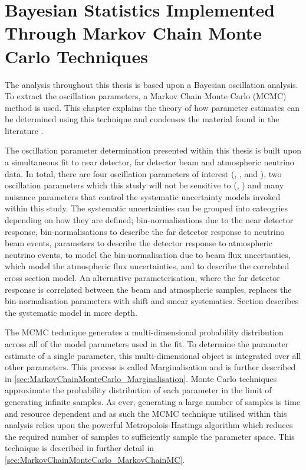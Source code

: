 \chapter{Bayesian Statistics Implemented Through Markov Chain Monte Carlo Techniques}
\label{chap:MarkovChainMonteCarlo}
The analysis throughout this thesis is based upon a Bayesian oscillation analysis. To extract the oscillation parameters, a Markov Chain Monte Carlo (MCMC) method is used. This chapter explains the theory of how parameter estimates can be determined using this technique and condenses the material found in the literature \cite{mcmc_handbook, mcmc_practice, thesis_clarence, thesis_kirsty}.

The oscillation parameter determination presented within this thesis is built upon a simultaneous fit to near detector, far detector beam and atmospheric neutrino data. In total, there are four oscillation parameters of interest (\sinsqatm, \sinsqreac, \delmsqatm and \dcp), two oscillation parameters which this study will not be sensitive to (\sinsqsol, \delmsqsol) and  many nuisance parameters that control the systematic uncertainty models invoked within this study. The systematic uncertainties can be grouped into cateogries depending on how they are defined;  bin-normalisations due to the near detector response,  bin-normalisations to describe the far detector response to neutrino beam events,  parameters to describe the detector response to atmospheric neutrino events,  to model the bin-normalisation due to beam flux uncertanties,  which model the atmospheric flux uncertainties, and  to describe the correlated cross section model. An alternative parameterisation, where the far detector response is correlated between the beam and atmospheric samples, replaces the bin-normalisation parameters with  shift and smear systematics. Section  describes the systematic model in more depth.

The MCMC technique generates a multi-dimensional probability distribution across all of the model parameters used in the fit. To determine the parameter estimate of a single parameter, this multi-dimensional object is integrated over all other parameters. This process is called Marginalisation and is further described in \autoref{sec:MarkovChainMonteCarlo_Marginalisation}. Monte Carlo techniques approximate the probability distribution of each parameter in the limit of generating infinite samples. As ever, generating a large number of samples is time and resource dependent and as such the MCMC technique utilised within this analysis relies upon the powerful Metropolois-Hastings algorithm which reduces the required number of samples to sufficiently sample the parameter space. This technique is described in further detail in \autoref{sec:MarkovChainMonteCarlo_MarkovChainMC}.

